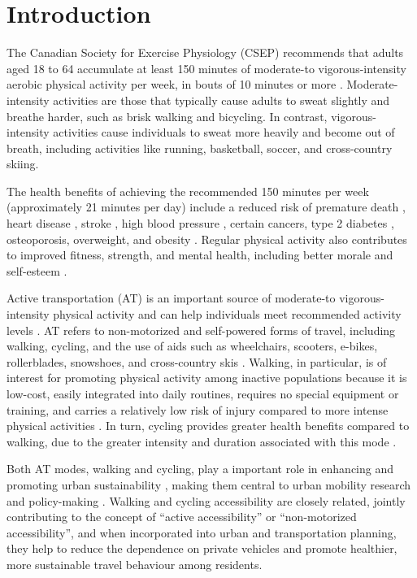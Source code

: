 \documentclass[preprint, 3p,
authoryear]{elsarticle} %
\begin{document}
\section{Introduction}\label{introduction}

The Canadian Society for Exercise Physiology (CSEP) recommends that
adults aged 18 to 64 accumulate at least 150 minutes of moderate-to
vigorous-intensity aerobic physical activity per week, in bouts of 10
minutes or more \citep{csep2012}. Moderate-intensity activities are
those that typically cause adults to sweat slightly and breathe harder,
such as brisk walking and bicycling. In contrast, vigorous-intensity
activities cause individuals to sweat more heavily and become out of
breath, including activities like running, basketball, soccer, and
cross-country skiing.

The health benefits of achieving the recommended 150 minutes per week
(approximately 21 minutes per day) include a reduced risk of premature
death \citep{hakim1998effects}, heart disease
\citep{lacroix1996, hakim1999}, stroke \citep{hu2000}, high blood
pressure \citep{dunn1999}, certain cancers, type 2 diabetes
\citep{hu1999}, osteoporosis, overweight, and obesity
\citep{fogelholm2000}. Regular physical activity also contributes to
improved fitness, strength, and mental health, including better morale
and self-esteem \citep{csep2012}.

Active transportation (AT) is an important source of moderate-to
vigorous-intensity physical activity and can help individuals meet
recommended activity levels \citep{bryan2009}. AT refers to
non-motorized and self-powered forms of travel, including walking,
cycling, and the use of aids such as wheelchairs, scooters, e-bikes,
rollerblades, snowshoes, and cross-country skis \citep{csep2012}.
Walking, in particular, is of interest for promoting physical activity
among inactive populations because it is low-cost, easily integrated
into daily routines, requires no special equipment or training, and
carries a relatively low risk of injury compared to more intense
physical activities \citep{hootman2001, bryan2009}. In turn, cycling
provides greater health benefits compared to walking, due to the greater
intensity and duration associated with this mode
\citep{martin2014, barajas2021, borhani2024, celismorales2017}.

Both AT modes, walking and cycling, play a important role in enhancing
and promoting urban sustainability
\citep{hino2014built, lamiquiz2015effects}, making them central to urban
mobility research and policy-making
\citep{vandenbulcke2009mapping, wu2019measuring}. Walking and cycling
accessibility are closely related, jointly contributing to the concept
of ``active accessibility'' or ``non-motorized accessibility'', and when
incorporated into urban and transportation planning, they help to reduce
the dependence on private vehicles and promote healthier, more
sustainable travel behaviour among residents.
\end{document}
